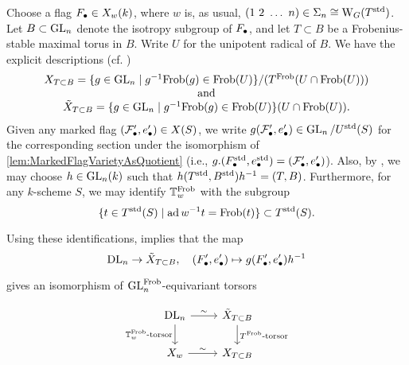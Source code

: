 \documentclass[../main.tex]{subfiles}
\begin{document}
Choose a flag $F_\bullet \in X_w(k)$, where $w$ is, as usual, $(1\ 2\ \dots \ n)
\in \Sigma_n \cong \mathrm W_G(T^{\mathrm{std}})$. Let $B \subset \operatorname{GL}_n$ denote the isotropy
subgroup of $F_\bullet$, and let 
$T \subset B$ be a Frobenius-stable maximal torus in $B$.
Write $U$ for the unipotent radical of $B$.
We have the explicit descriptions (cf. \cite[Definition 1.17]{delignelusztig1976})
\begin{equation} \label{eq:ExplicitDLVarieties}
  \begin{array}c
  X_{T \subset B} = \{g \in \GL_n \mid g^{-1} \Frob(g) \in \Frob(U)\}/(T^\Frob(U \cap \Frob(U)))\\
  \text{and} \\
  \tilde X_{T \subset B} = \{g \in \GL_n \mid g^{-1} \Frob(g) \in \Frob(U)\}(U
  \cap \Frob(U)).
  \end{array}
\end{equation}
Given any marked flag $(\mathcal{F}_\bullet', e'_\bullet) \in X(S)$, we write $g(\mathcal{F}_\bullet', e'_\bullet) \in
\operatorname{GL}_n/U^{\mathrm{std}}(S)$ for the corresponding
section under the isomorphism of \cref{lem:MarkedFlagVarietyAsQuotient}
(i.e., $g.(F_\bullet^{\mathrm{std}},e_\bullet^{\mathrm{std}}) = (\mathcal{F}_\bullet',e'_\bullet)$). Also, by 
\cite[Proposition 17.13]{milne2017algebraic}, we may
choose $h \in \operatorname{GL}_n(k)$ such that $h(T^{\mathrm{std}}, B^{\mathrm{std}})h^{-1} = (T,B)$. 
Furthermore, for any $k$-scheme $S$, we may identify $\mathbb{T}_w^{\mathrm{Frob}}$ with the subgroup 
\begin{equation*}
  \{t \in T^{\mathrm{std}}(S) \mid \operatorname{ad} w^{-1} t = \mathrm{Frob}(t)\} \subset T^{\mathrm{std}}(S).
\end{equation*}

Using these identifications, \cite[Proposition 1.19]{delignelusztig1976}
implies that the map
\begin{equation*}
\mathrm{DL}_n \to \tilde X_{T \subset B}, \quad (F_\bullet', e'_\bullet) \mapsto g(F_\bullet',
e'_\bullet)h^{-1}
\end{equation*}

gives an isomorphism of $\operatorname{GL}_n^{\mathrm{Frob}}$-equivariant torsors

\begin{equation*}
\begin{tikzcd}[ampersand replacement=\&]
	{\DL_n} \& {\tilde X_{T \subset B}} \\
	{X_w} \& {X_{T \subset B}}
	\arrow["\sim", from=1-1, to=1-2]
	\arrow["{\TT_w^\Frob\text{-torsor}}"', from=1-1, to=2-1]
	\arrow["{T^\Frob\text{-torsor}}", from=1-2, to=2-2]
	\arrow["\sim", from=2-1, to=2-2]
\end{tikzcd}
\end{equation*}
\end{document}
